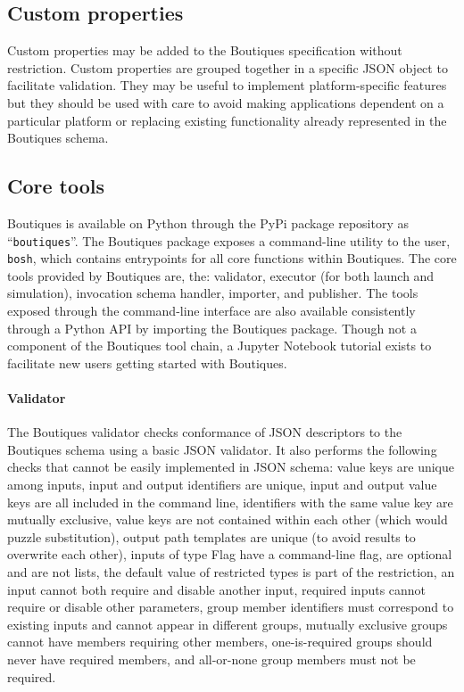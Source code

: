\documentclass[a4paper,num-refs]{oup-contemporary}
\newcommand{\boutiques}{Boutiques\xspace}
\begin{document}
\subsection{Custom properties}

Custom properties may be added to the Boutiques specification without
restriction. Custom properties are grouped together in a specific JSON object
to facilitate validation. They may be useful to implement
platform-specific features but they should be used with care to avoid
making applications dependent on a particular platform or replacing
existing functionality already represented in the \boutiques schema.

\subsection{Core tools} 

\boutiques is available on Python through the PyPi package repository
as ``\texttt{boutiques}''. The \boutiques package exposes a
command-line utility to the user, \texttt{bosh}, which contains
entrypoints for all core functions within \boutiques. The core tools
provided by \boutiques are, the: validator, executor (for both launch
and simulation), invocation schema handler, importer, and
publisher. The tools exposed through the command-line interface are also
available consistently through a Python API by importing the
\boutiques package. Though not a component of the \boutiques tool
chain, a Jupyter Notebook tutorial exists to facilitate new users
getting started with \boutiques.

\paragraph{Validator} The \boutiques validator checks conformance of JSON
descriptors to the \boutiques schema using a basic JSON validator. It
also performs the following checks that cannot be easily implemented
in JSON schema: value keys are unique among inputs, input and output
identifiers are unique, input and output value keys are all included
in the command line, identifiers with the same value key are mutually
exclusive, value keys are not contained within each other (which would
puzzle substitution), output path templates are unique (to avoid
results to overwrite each other), inputs of type Flag have a
command-line flag, are optional and are not lists, the default value
of restricted types is part of the restriction, an input cannot both
require and disable another input, required inputs cannot require or
disable other parameters, group member identifiers must correspond to
existing inputs and cannot appear in different groups, mutually
exclusive groups cannot have members requiring other members,
one-is-required groups should never have required members, and
all-or-none group members must not be required.
\end{document}

